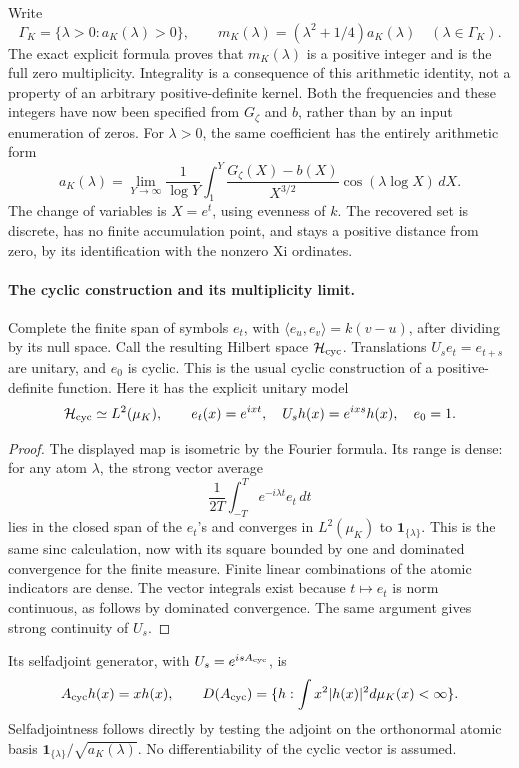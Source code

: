 \documentclass[11pt,a4paper]{article}
\begin{document}
Write
\[
 \Gamma_K=\{\lambda>0:a_K(\lambda)>0\},\qquad
 m_K(\lambda)=(\lambda^2+1/4)a_K(\lambda)
 \quad(\lambda\in\Gamma_K).
\]
The exact explicit formula proves that \(m_K(\lambda)\) is a
positive integer and is the full zero multiplicity.
Integrality is a consequence of this arithmetic identity, not a
property of an arbitrary positive-definite kernel.
Both the frequencies and these integers have now been specified
from \(G_\zeta\) and \(b\), rather than by an input enumeration of zeros.
For \(\lambda>0\), the same coefficient has the entirely arithmetic form
\[
 a_K(\lambda)=
 \lim_{Y\to\infty}\frac1{\log Y}
 \int_1^Y
 \frac{G_\zeta(X)-b(X)}{X^{3/2}}
       \cos(\lambda\log X)\,dX.
\]
The change of variables is \(X=e^t\), using evenness of \(k\).
The recovered set is discrete, has no finite accumulation point,
and stays a positive distance from zero, by its identification with
the nonzero Xi ordinates.

\paragraph{The cyclic construction and its multiplicity limit.}
Complete the finite span of symbols \(e_t\), with
\(\langle e_u,e_v\rangle=k(v-u)\), after dividing by its null space.
Call the resulting Hilbert space \(\mathcal H_{\rm cyc}\).
Translations \(U_se_t=e_{t+s}\) are unitary, and \(e_0\) is cyclic.
This is the usual cyclic construction of a positive-definite function.
Here it has the explicit unitary model
\[
 \mathcal H_{\rm cyc}\simeq L^2(\mu_K),\qquad
 e_t(x)=e^{ixt},\quad U_sh(x)=e^{ixs}h(x),\quad e_0=1.
\]
\begin{proof}
The displayed map is isometric by the Fourier formula.
Its range is dense: for any atom \(\lambda\), the strong vector average
\[
 \frac1{2T}\int_{-T}^{T}e^{-i\lambda t}e_t\,dt
\]
lies in the closed span of the \(e_t\)'s and converges in
\(L^2(\mu_K)\) to \(\mathbf1_{\{\lambda\}}\).
This is the same sinc calculation, now with its square bounded
by one and dominated convergence for the finite measure.
Finite linear combinations of the atomic indicators are dense.
The vector integrals exist because \(t\mapsto e_t\) is norm
continuous, as follows by dominated convergence.
The same argument gives strong continuity of \(U_s\).
\end{proof}
Its selfadjoint generator, with \(U_s=e^{isA_{\rm cyc}}\), is
\[
 A_{\rm cyc}h(x)=xh(x),\qquad
 D(A_{\rm cyc})=\{h:\int x^2|h(x)|^2d\mu_K(x)<\infty\}.
\]
Selfadjointness follows directly by testing the adjoint on the
orthonormal atomic basis
\(\mathbf1_{\{\lambda\}}/\sqrt{a_K(\lambda)}\).
No differentiability of the cyclic vector is assumed.
\end{document}
